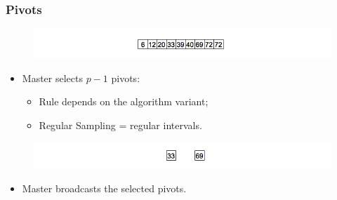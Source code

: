 \documentclass{beamer}
\begin{document}
\begin{frame}
	\frametitle{Pivots}
	\begin{figure}
		\begin{center}
			\includegraphics[width=\textwidth]{images/04samporder.png}
		\end{center}
	\end{figure}
	
	\pause
	\begin{itemize}
		\item{Master selects $p-1$ pivots:
		\begin{itemize}
			\item{Rule depends on the algorithm variant;}
			\item{Regular Sampling = regular intervals.}
		\end{itemize}
		}
	\end{itemize}
	
	\begin{figure}
		\begin{center}
			\includegraphics[width=\textwidth]{images/05pivots.png}
		\end{center}
	\end{figure}
	
	\pause
	\begin{itemize}
		\item{Master broadcasts the selected pivots.}
	\end{itemize}
\end{frame}
\end{document}
